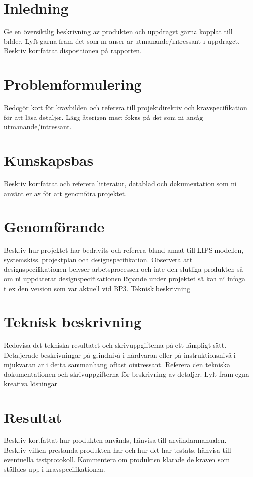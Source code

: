 \documentclass[a4paper,12pt,fleqn]{article}
\begin{document}
\addto\captionsswedish{\renewcommand{\contentsname}{Innehållsförteckning}}

\tableofcontents
\thispagestyle{fancy}
\newpage


\section{Inledning}
Ge en översiktlig beskrivning av produkten och uppdraget gärna kopplat till bilder.
Lyft gärna fram det som ni anser är utmanande/intressant i uppdraget. 
Beskriv kortfattat dispositionen på rapporten.
\section{Problemformulering}
Redogör kort för kravbilden och referera till projektdirektiv och kravspecifikation för att läsa detaljer.
Lägg återigen mest fokus på det som ni ansåg utmanande/intressant. 
\section{Kunskapsbas}
Beskriv kortfattat och referera litteratur, datablad och dokumentation som ni använt er av för att genomföra projektet. 
\section{Genomförande}
Beskriv hur projektet har bedrivits och referera bland annat till LIPS-modellen, systemskiss, projektplan och designspecifikation. Observera att designspecifikationen belyser arbetsprocessen och inte den slutliga produkten så om ni uppdaterat designspecifikationen löpande under projektet så kan ni infoga t ex den version som var aktuell vid BP3.
Teknisk beskrivning
\section{Teknisk beskrivning}
Redovisa det tekniska resultatet och skrivuppgifterna på ett lämpligt sätt. Detaljerade beskrivningar på grindnivå i hårdvaran eller på instruktionsnivå i mjukvaran är i detta sammanhang oftast ointressant. Referera den tekniska dokumentationen och skrivuppgifterna för beskrivning av detaljer. Lyft fram egna kreativa lösningar!
\section{Resultat}
Beskriv kortfattat hur produkten används, hänvisa till användarmanualen.
Beskriv vilken prestanda produkten har och hur det har testats, hänvisa till eventuella testprotokoll.
Kommentera om produkten klarade de kraven som ställdes upp i kravspecifikationen. 
\end{document}
